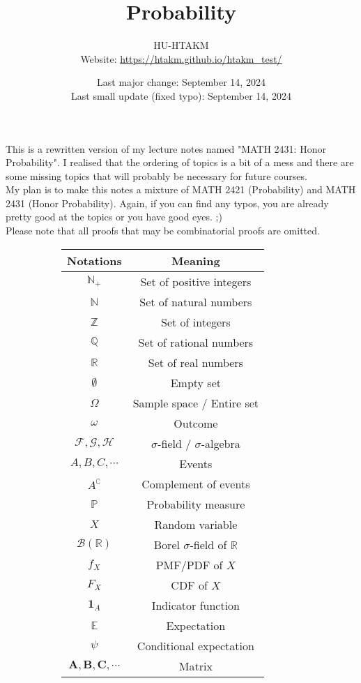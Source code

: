 \documentclass{huhtakm-template-book}
\title{Probability}
\author{
	HU-HTAKM\\
	Website: \url{https://htakm.github.io/htakm_test/}
}
\date{
	Last major change: September 14, 2024\\
	Last small update (fixed typo): September 14, 2024
}
\newcommand{\prob}{\mathbb{P}}
\begin{document}
\maketitle
This is a rewritten version of my lecture notes named "MATH 2431: Honor Probability". I realised that the ordering of topics is a bit of a mess and there are some missing topics that will probably be necessary for future courses.\\
My plan is to make this notes a mixture of MATH 2421 (Probability) and MATH 2431 (Honor Probability). Again, if you can find any typos, you are already pretty good at the topics or you have good eyes. ;)\\
Please note that all proofs that may be combinatorial proofs are omitted.
\begin{figure}[h]
	\begin{subfigure}{0.45\textwidth}
		\centering
		\begin{tabular}{cc}
			Notations & Meaning\\
			\hline
			$\mathbb{N}_{+}$ & Set of positive integers\\
			$\mathbb{N}$ & Set of natural numbers\\
			$\mathbb{Z}$ & Set of integers\\
			$\mathbb{Q}$ & Set of rational numbers\\
			$\mathbb{R}$ & Set of real numbers\\
			$\emptyset$ & Empty set\\
			$\Omega$ & Sample space / Entire set\\
			$\omega$ & Outcome\\
			$\mathcal{F},\mathcal{G},\mathcal{H}$ & $\sigma$-field / $\sigma$-algebra\\
			$A,B,C,\cdots$ & Events\\
			$A^{\complement}$ & Complement of events\\
			$\prob$ & Probability measure\\
			$X$ & Random variable\\
			$\mathcal{B}(\mathbb{R})$ & Borel $\sigma$-field of $\mathbb{R}$ \\
			$f_{X}$ & PMF/PDF of $X$\\
			$F_{X}$ & CDF of $X$\\
			$\mathbf{1}_{A}$ & Indicator function\\
			$\mathbb{E}$ & Expectation\\
			$\psi$ & Conditional expectation\\
			$\mathbf{A},\mathbf{B},\mathbf{C},\cdots$ & Matrix\\

\end{tabular}
\end{subfigure}
\end{figure}
\end{document}
